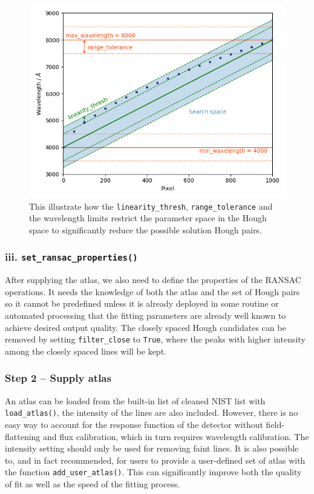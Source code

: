 \documentclass{aa}
\begin{document}
\begin{figure}[h]
    \centering
    \includegraphics[width=\columnwidth]{figure_1_threshold_plot.png}
    \caption{This illustrate how the \texttt{linearity\_thresh},
    \texttt{range\_tolerance} and the wavelength limits restrict the parameter
    space in the Hough space to significantly reduce the possible solution Hough
    pairs.}
    \label{fig:threshold}
\end{figure}

\subsubsection*{iii. \texttt{set\_ransac\_properties()}}
After supplying the atlas, we also need to define the properties of the RANSAC
operations. It needs the knowledge of both the atlas and the set of Hough pairs
so it cannot be predefined unless it is already deployed in some routine or
automated processing that the fitting parameters are already well known to
achieve desired output quality. The closely spaced Hough candidates can be
removed by setting \texttt{filter\_close} to \texttt{True}, where the peaks with
higher intensity among the closely spaced lines will be kept.

\subsubsection*{Step 2 -- Supply atlas}
An atlas can be loaded from the built-in list of cleaned NIST list with
\texttt{load\_atlas()}, the intensity of the lines are also included.
However, there is no easy way to account for the response function of
the detector without field-flattening and flux calibration, which in turn
requires wavelength calibration. The intensity setting should only be
used for removing faint lines. It is also possible to, and in fact
recommended, for users to provide a user-defined set of atlas with the
function \texttt{add\_user\_atlas()}. This can significantly improve
both the quality of fit as well as the speed of the fitting process.
\end{document}
